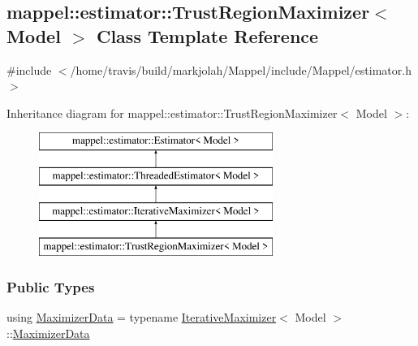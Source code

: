 \hypertarget{classmappel_1_1estimator_1_1TrustRegionMaximizer}{}\subsection{mappel\+:\+:estimator\+:\+:Trust\+Region\+Maximizer$<$ Model $>$ Class Template Reference}
\label{classmappel_1_1estimator_1_1TrustRegionMaximizer}


{\ttfamily \#include $<$/home/travis/build/markjolah/\+Mappel/include/\+Mappel/estimator.\+h$>$}

Inheritance diagram for mappel\+:\+:estimator\+:\+:Trust\+Region\+Maximizer$<$ Model $>$\+:\begin{figure}[H]
\begin{center}
\leavevmode
\includegraphics[height=4.000000cm]{classmappel_1_1estimator_1_1TrustRegionMaximizer}
\end{center}
\end{figure}
\subsubsection*{Public Types}
\begin{DoxyCompactItemize}
\item 
using \hyperlink{classmappel_1_1estimator_1_1TrustRegionMaximizer_a7993af21f384fe7506a043dc0548d1b4}{Maximizer\+Data} = typename \hyperlink{classmappel_1_1estimator_1_1IterativeMaximizer}{Iterative\+Maximizer}$<$ Model $>$\+::\hyperlink{classmappel_1_1estimator_1_1TrustRegionMaximizer_a7993af21f384fe7506a043dc0548d1b4}{Maximizer\+Data}
\end{DoxyCompactItemize}
